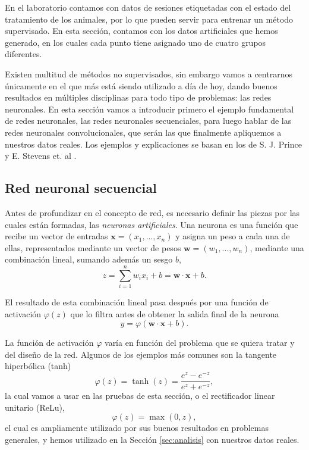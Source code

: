 En el laboratorio contamos con datos de sesiones etiquetadas con el estado del tratamiento de los animales, por lo que pueden servir para entrenar un método supervisado. En esta sección, contamos con los datos artificiales que hemos generado, en los cuales cada punto tiene asignado uno de cuatro grupos diferentes.

Existen multitud de métodos no supervisados, sin embargo vamos a centrarnos únicamente en el que más está siendo utilizado a día de hoy, dando buenos resultados en múltiples disciplinas para todo tipo de problemas: las redes neuronales. En esta sección vamos a introducir primero el ejemplo fundamental de redes neuronales, las redes neuronales secuenciales, para luego hablar de las redes neuronales convolucionales, que serán las que finalmente apliquemos a nuestros datos reales. Los ejemplos y explicaciones se basan en los de S. J. Prince \cite{understanding} y E. Stevens et. al \cite{pytorch}.

\subsection{Red neuronal secuencial}

Antes de profundizar en el concepto de red, es necesario definir las piezas por las cuales están formadas, las \textit{neuronas artificiales}. Una neurona es una función que recibe un vector de entradas $ \mathbf{x} = (x_1, ..., x_n) $ y asigna un peso a cada una de ellas, representados mediante un vector de pesos $ \mathbf{w} = (w_1, ..., w_n) $, mediante una combinación lineal, sumando además un sesgo $ b $,
\begin{equation}
  z = \sum_{i=1}^n w_i x_i + b = \mathbf{w} \cdot \mathbf{x} + b.
\end{equation}

El resultado de esta combinación lineal pasa después por una función de activación $ \varphi(z) $ que lo filtra antes de obtener la salida final de la neurona
\begin{equation}
  y = \varphi(\mathbf{w} \cdot \mathbf{x} + b).
\end{equation}

La función de activación $ \varphi $ varía en función del problema que se quiera tratar y del diseño de la red. Algunos de los ejemplos más comunes son la tangente hiperbólica (tanh)
\begin{equation}
  \varphi(z) = \operatorname{tanh}(z) = \frac{e^z - e^{-z}}{e^z + e^{-z}},
\end{equation}
la cual vamos a usar en las pruebas de esta sección, o el rectificador linear unitario (ReLu),
\begin{equation}
  \varphi(z) = \operatorname{max}(0, z),
\end{equation}
el cual es ampliamente utilizado por sus buenos resultados en problemas generales, y hemos utilizado en la Sección \ref{sec:analisis} con nuestros datos reales.

